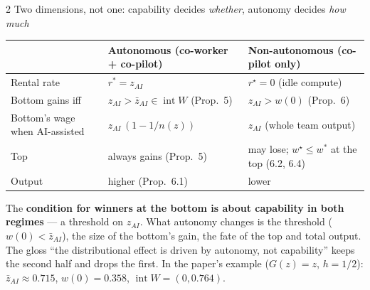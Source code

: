 \documentclass[aspectratio=169,11pt]{beamer}
\begin{document}
\begin{frame}{2 \textperiodcentered{} Two dimensions, not one: capability decides \emph{whether}, autonomy decides \emph{how much}}
  \footnotesize
  \begin{center}\scriptsize
  \begin{tabular}{@{}lll@{}}
    \toprule
     & \textbf{Autonomous} (co-worker + co-pilot) & \textbf{Non-autonomous} (co-pilot only)\\
    \midrule
    Rental rate & $r^*=z_{AI}$ & $r^\star=0$ (idle compute)\\
    Bottom gains iff & $z_{AI}>\bar z_{AI}\in\operatorname{int}W$ (Prop.\ 5) & $z_{AI}>w(0)$ (Prop.\ 6)\\
    Bottom's wage when AI-assisted & $z_{AI}\,(1-1/n(z))$ & $z_{AI}$ (whole team output)\\
    Top & always gains (Prop.\ 5) & may lose; $w^\star\le w^*$ at the top (6.2, 6.4)\\
    Output & higher (Prop.\ 6.1) & lower\\
    \bottomrule
  \end{tabular}
  \end{center}
  \smallskip
  The \textbf{condition for winners at the bottom is about capability in both regimes} --- a threshold on $z_{AI}$.
  What autonomy changes is the threshold ($w(0)<\bar z_{AI}$), the size of the bottom's gain, the fate of the top and
  total output. The gloss ``the distributional effect is driven by autonomy, not capability'' keeps the second half and
  drops the first. In the paper's example ($G(z)=z$, $h=1/2$): $\bar z_{AI}\approx0.715$, $w(0)=0.358$,
  $\operatorname{int}W=(0,0.764)$.
\end{frame}
\end{document}
